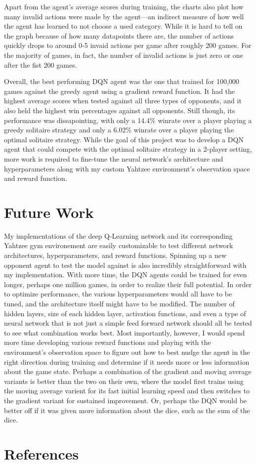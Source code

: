 \documentclass[12pt]{article}
\begin{document}
Apart from the agent's average scores during training, the charts also plot how many invalid actions were made by the agent—an indirect measure of how well the agent has learned to not choose a used category. While it is hard to tell on the graph because of how many datapoints there are, the number of actions quickly drops to around 0-5 invaid actions per game after roughly 200 games. For the majority of games, in fact, the number of invalid actions is just zero or one after the fist 200 games.

Overall, the best performing DQN agent was the one that trained for 100,000 games against the greedy agent using a gradient reward function. It had the highest average scores when tested against all three types of opponents, and it also held the highest win percentages against all opponents. Still though, its performance was dissapointing, with only a 14.4\% winrate over a player playing a greedy solitaire strategy and only a 6.02\% winrate over a player playing the optimal solitaire strategy. While the goal of this project was to develop a DQN agent that could compete with the optimal solitaire strategy in a 2-player setting, more work is required to fine-tune the neural network's architecture and hyperparameters along with my custom Yahtzee environment's observation space and reward function.

\section{Future Work}
My implementations of the deep Q-Learning network and its corresponding Yahtzee gym environement are easily customizable to test different network architectures, hyperparameters, and reward functions. Spinning up a new opponent agent to test the model against is also incredibly straightforward with my implementation. With more time, the DQN agents could be trained for even longer, perhaps one million games, in order to realize their full potential. In order to optimize performance, the various hyperparameters would all have to be tuned, and the architecture itself might have to be modified. The number of hidden layers, size of each hidden layer, activation functions, and even a type of neural network that is not just a simple feed forward network should all be tested to see what combination works best. Most importantly, however, I would spend more time developing various reward functions and playing with the environment's observation space to figure out how to best nudge the agent in the right direction during training and determine if it needs more or less information about the game state. Perhaps a combination of the gradient and moving average variants is better than the two on their own, where the model first trains using the moving average varient for its fast initial learning speed and then switches to the gradient variant for sustained improvement. Or, perhaps the DQN would be better off if it was given more information about the dice, such as the sum of the dice. 



\newpage

\section{References}
\printbibliography[heading=none]
\end{document}
